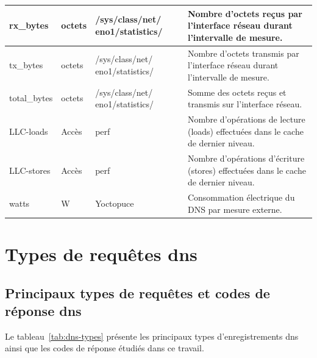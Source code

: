 \documentclass[12pt, a4paper]{report}
\begin{document}
\begin{longtable}{|p{3.5cm}|p{2cm}|p{3cm}|p{7cm}|}
		rx\_bytes & octets & /sys/class/net/ eno1/statistics/ & Nombre d'octets reçus par l'interface réseau durant l'intervalle de mesure. \\
		\hline

		tx\_bytes & octets & /sys/class/net/ eno1/statistics/ & Nombre d'octets transmis par l'interface réseau durant l'intervalle de mesure. \\
		\hline

		total\_bytes & octets & /sys/class/net/ eno1/statistics/ & Somme des octets reçus et transmis sur l'interface réseau. \\
		\hline

		LLC-loads & Accès & perf & Nombre d'opérations de lecture (loads) effectuées dans le cache de dernier niveau. \\
		\hline

		LLC-stores & Accès & perf & Nombre d'opérations d'écriture (stores) effectuées dans le cache de dernier niveau. \\
		\hline

		watts & W & Yoctopuce & Consommation électrique du DNS par mesure externe. \\
		\hline

	\end{longtable}

	\section*{Types de requêtes \gls{dns}} \label{types}
	
	
	\subsection*{Principaux types de requêtes et codes de réponse \gls{dns}}

	Le tableau~\ref{tab:dns-types} présente les principaux types d'enregistrements \gls{dns} ainsi que les codes de réponse étudiés dans ce travail.
\end{document}
